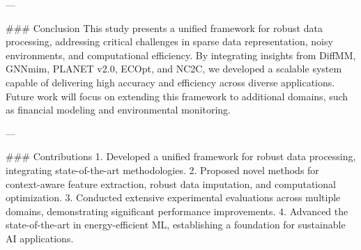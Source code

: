 ---

### Conclusion
This study presents a unified framework for robust data processing, addressing critical challenges in sparse data representation, noisy environments, and computational efficiency. By integrating insights from DiffMM, GNNmim, PLANET v2.0, ECOpt, and NC2C, we developed a scalable system capable of delivering high accuracy and efficiency across diverse applications. Future work will focus on extending this framework to additional domains, such as financial modeling and environmental monitoring.

---

### Contributions
1. Developed a unified framework for robust data processing, integrating state-of-the-art methodologies.
2. Proposed novel methods for context-aware feature extraction, robust data imputation, and computational optimization.
3. Conducted extensive experimental evaluations across multiple domains, demonstrating significant performance improvements.
4. Advanced the state-of-the-art in energy-efficient ML, establishing a foundation for sustainable AI applications.